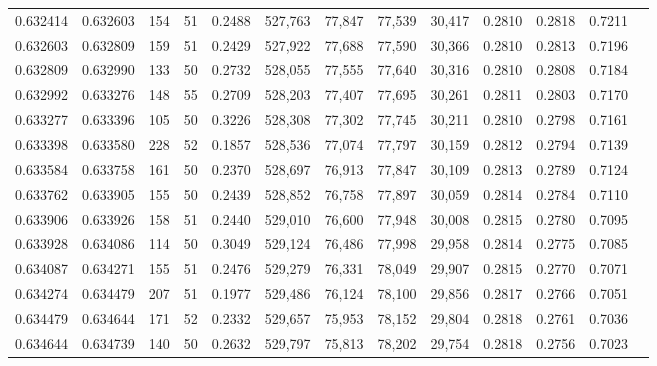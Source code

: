 \begin{tabular}{rrrrrrrrrrrrr}
0.632414 & 0.632603 &   154 &  51 &                                     0.2488 & 527,763 &  77,847 &  77,539 &  30,417 & 0.2810 & 0.2818 & 0.7211 \\
0.632603 & 0.632809 &   159 &  51 &                                     0.2429 & 527,922 &  77,688 &  77,590 &  30,366 & 0.2810 & 0.2813 & 0.7196 \\
0.632809 & 0.632990 &   133 &  50 &                                     0.2732 & 528,055 &  77,555 &  77,640 &  30,316 & 0.2810 & 0.2808 & 0.7184 \\
0.632992 & 0.633276 &   148 &  55 &                                     0.2709 & 528,203 &  77,407 &  77,695 &  30,261 & 0.2811 & 0.2803 & 0.7170 \\
0.633277 & 0.633396 &   105 &  50 &                                     0.3226 & 528,308 &  77,302 &  77,745 &  30,211 & 0.2810 & 0.2798 & 0.7161 \\
0.633398 & 0.633580 &   228 &  52 &                                     0.1857 & 528,536 &  77,074 &  77,797 &  30,159 & 0.2812 & 0.2794 & 0.7139 \\
0.633584 & 0.633758 &   161 &  50 &                                     0.2370 & 528,697 &  76,913 &  77,847 &  30,109 & 0.2813 & 0.2789 & 0.7124 \\
0.633762 & 0.633905 &   155 &  50 &                                     0.2439 & 528,852 &  76,758 &  77,897 &  30,059 & 0.2814 & 0.2784 & 0.7110 \\
0.633906 & 0.633926 &   158 &  51 &                                     0.2440 & 529,010 &  76,600 &  77,948 &  30,008 & 0.2815 & 0.2780 & 0.7095 \\
0.633928 & 0.634086 &   114 &  50 &                                     0.3049 & 529,124 &  76,486 &  77,998 &  29,958 & 0.2814 & 0.2775 & 0.7085 \\
0.634087 & 0.634271 &   155 &  51 &                                     0.2476 & 529,279 &  76,331 &  78,049 &  29,907 & 0.2815 & 0.2770 & 0.7071 \\
0.634274 & 0.634479 &   207 &  51 &                                     0.1977 & 529,486 &  76,124 &  78,100 &  29,856 & 0.2817 & 0.2766 & 0.7051 \\
0.634479 & 0.634644 &   171 &  52 &                                     0.2332 & 529,657 &  75,953 &  78,152 &  29,804 & 0.2818 & 0.2761 & 0.7036 \\
0.634644 & 0.634739 &   140 &  50 &                                     0.2632 & 529,797 &  75,813 &  78,202 &  29,754 & 0.2818 & 0.2756 & 0.7023 \\

\end{tabular}
